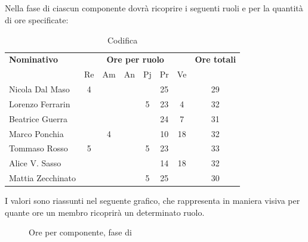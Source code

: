 \subsection{\Cod}
Nella fase di \Cod{} ciascun componente dovrà ricoprire i seguenti ruoli e per la quantità di ore specificate:

\begin{table}[H]
	\centering
	\begin{tabular}{|l|c|c|c|c|c|c|c|}
		\hline
		\textbf{Nominativo} & 
		\multicolumn{6}{c|}{\textbf{Ore per ruolo}} & 
		\textbf{Ore totali} \\
		& Re & Am & An & Pj & Pr & Ve & \\
		\hline
		Nicola Dal Maso &4 & & & &25 & & 29 \\
		Lorenzo Ferrarin & & & &5 &23 &4 & 32 \\
		Beatrice Guerra & & & & &24 &7 & 31 \\
		Marco Ponchia & &4 & & &10 &18 & 32 \\
		Tommaso Rosso &5 & & &5 &23 & & 33 \\
		Alice V. Sasso & & & & &14 &18 & 32 \\
		Mattia Zecchinato & & & &5 &25 & & 30 \\
		\hline
	\end{tabular}
	\caption{Codifica}
\end{table}
I valori sono riassunti nel seguente grafico, che rappresenta in maniera visiva per quante ore un membro ricoprirà un determinato ruolo.
\begin{figure}[H]
	\centering
	\caption{Ore per componente, fase di \Cod}
\end{figure}

